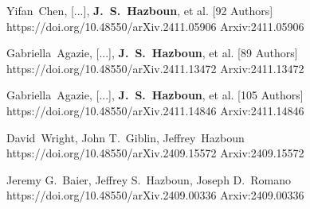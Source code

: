          {Yifan~{Chen}, [...], \textbf{J.~S.~{Hazboun}}, et al. [92 Authors]}
         {https://doi.org/10.48550/arXiv.2411.05906}
         {{Arxiv:}2411.05906}

         {Gabriella~{Agazie}, [...], \textbf{J.~S.~{Hazboun}}, et al. [89 Authors]}
         {https://doi.org/10.48550/arXiv.2411.13472}
         {{Arxiv:}2411.13472}

         {Gabriella~{Agazie}, [...], \textbf{J.~S.~{Hazboun}}, et al. [105 Authors]}
         {https://doi.org/10.48550/arXiv.2411.14846}
         {{Arxiv:}2411.14846}

         {David~{Wright}, John T.~{Giblin}, Jeffrey~{Hazboun}}
         {https://doi.org/10.48550/arXiv.2409.15572}
         {{Arxiv:}2409.15572}

         {Jeremy G.~{Baier}, Jeffrey S.~{Hazboun}, Joseph D.~{Romano}}
         {https://doi.org/10.48550/arXiv.2409.00336}
         {{Arxiv:}2409.00336}

